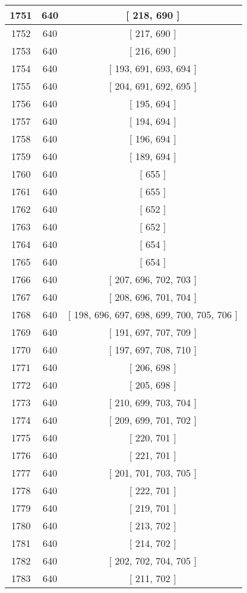 \begin{center}
\begin{longtable}[H]{|| c c c ||}
1751 & 640 & [ 218, 690 ] \\ 
\hline
1752 & 640 & [ 217, 690 ] \\ 
\hline
1753 & 640 & [ 216, 690 ] \\ 
\hline
1754 & 640 & [ 193, 691, 693, 694 ] \\ 
\hline
1755 & 640 & [ 204, 691, 692, 695 ] \\ 
\hline
1756 & 640 & [ 195, 694 ] \\ 
\hline
1757 & 640 & [ 194, 694 ] \\ 
\hline
1758 & 640 & [ 196, 694 ] \\ 
\hline
1759 & 640 & [ 189, 694 ] \\ 
\hline
1760 & 640 & [ 655 ] \\ 
\hline
1761 & 640 & [ 655 ] \\ 
\hline
1762 & 640 & [ 652 ] \\ 
\hline
1763 & 640 & [ 652 ] \\ 
\hline
1764 & 640 & [ 654 ] \\ 
\hline
1765 & 640 & [ 654 ] \\ 
\hline
1766 & 640 & [ 207, 696, 702, 703 ] \\ 
\hline
1767 & 640 & [ 208, 696, 701, 704 ] \\ 
\hline
1768 & 640 & [ 198, 696, 697, 698, 699, 700, 705, 706 ] \\ 
\hline
1769 & 640 & [ 191, 697, 707, 709 ] \\ 
\hline
1770 & 640 & [ 197, 697, 708, 710 ] \\ 
\hline
1771 & 640 & [ 206, 698 ] \\ 
\hline
1772 & 640 & [ 205, 698 ] \\ 
\hline
1773 & 640 & [ 210, 699, 703, 704 ] \\ 
\hline
1774 & 640 & [ 209, 699, 701, 702 ] \\ 
\hline
1775 & 640 & [ 220, 701 ] \\ 
\hline
1776 & 640 & [ 221, 701 ] \\ 
\hline
1777 & 640 & [ 201, 701, 703, 705 ] \\ 
\hline
1778 & 640 & [ 222, 701 ] \\ 
\hline
1779 & 640 & [ 219, 701 ] \\ 
\hline
1780 & 640 & [ 213, 702 ] \\ 
\hline
1781 & 640 & [ 214, 702 ] \\ 
\hline
1782 & 640 & [ 202, 702, 704, 705 ] \\ 
\hline
1783 & 640 & [ 211, 702 ] \\ 

\end{longtable}
\end{center}
